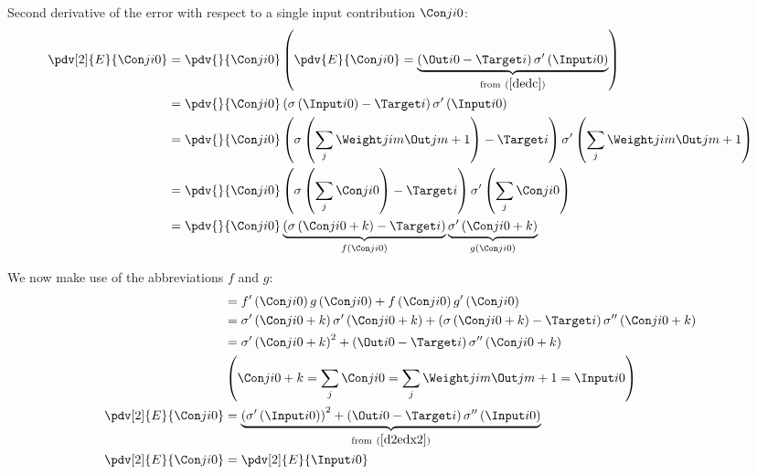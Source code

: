 Second derivative of the error with respect to a single input contribution $\Con j i 0$:
\begin{align}
\pdv[2]{E}{{\Con j i 0}} &=
\pdv{}{\Con j i 0} 
\left(\pdv{E}{\Con j i 0} = 
\underbrace{\left(\Out i 0 - \Target i \right) \sigma^{\prime}\left(\Input i 0\right)}
_{\text{from} \ (\ref{dedc})}
\right)
\\
&=\pdv{}{\Con j i 0}\left(\sigma\left(\Input i 0\right) - \Target i \right) \sigma^{\prime}\left(\Input i 0\right)
\\
&=\pdv{}{\Con j i 0}\left(\sigma\left(\sum\limits_j {\Weight j i m}{ \Out j {m + 1}}\right) - \Target i \right) \sigma^{\prime}\left(\sum\limits_j {\Weight j i m}{ \Out j {m + 1}}\right)
\\
&=\pdv{}{\Con j i 0}\left(\sigma\left(\sum\limits_j {\Con j i 0}\right) - \Target i \right) \sigma^{\prime}\left(\sum\limits_j {\Con j i 0}\right)
\\
&=\pdv{}{\Con j i 0}
\underbrace{\left(\sigma\left({\Con j i 0} + k\right) - \Target i \right)}
_{f\left(\Con j i 0\right)}
\underbrace{\sigma^{\prime}\left({\Con j i 0} + k\right)}
_{g\left(\Con j i 0\right)}
\end{align}

We now make use of the abbreviations $f$ and $g$:
\begin{align}
&=f^{\prime}\left(\Con j i 0\right)g\left(\Con j i 0\right) + f\left(\Con j i 0\right)g^{\prime}\left(\Con j i 0\right)
\\
&=\sigma^{\prime}\left({\Con j i 0} + k\right)\sigma^{\prime}\left({\Con j i 0} + k\right) + 
\left(\sigma\left({\Con j i 0} + k\right) - \Target i \right)\sigma^{\prime\prime}\left({\Con j i 0} + k\right)
\\
&=\sigma^{\prime}\left({\Con j i 0} + k\right)^2 + 
\left(\Out i 0 - \Target i \right)\sigma^{\prime\prime}\left({\Con j i 0} + k\right)
\\
&\left(\Con j i 0 + k = \sum_j{\Con j i 0} = \sum\limits_j {\Weight j i m}{ \Out j {m + 1}} = \Input i 0 \right)
\\
\pdv[2]{E}{{\Con j i 0}}&=
\underbrace{\left(\sigma^{\prime}\left(\Input i 0\right)\right)^2 + 
\left(\Out i 0 - \Target i \right)\sigma^{\prime\prime}\left(\Input i 0\right)}
_{\text{from} \ (\ref{d2edx2})}
\\
\pdv[2]{E}{{\Con j i 0}} &= \pdv[2]{E}{{\Input i 0}}
\end{align}


